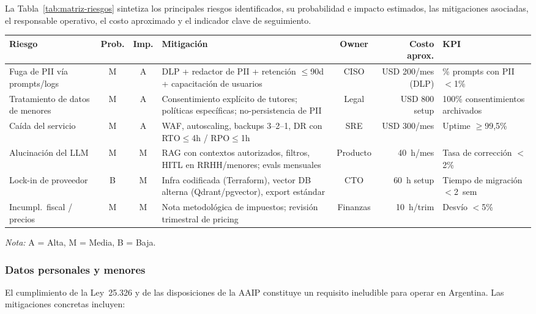 La Tabla~\ref{tab:matriz-riesgos} sintetiza los principales riesgos identificados, su probabilidad e impacto estimados, las mitigaciones asociadas, el responsable operativo, el costo aproximado y el indicador clave de seguimiento.

\begin{center}
\label{tab:matriz-riesgos}
\footnotesize
\begin{adjustbox}{width=\textwidth,center}
\begin{tabular}{p{2.8cm}ccp{4.2cm}crp{2.8cm}}
\hline
\textbf{Riesgo} & \textbf{Prob.} & \textbf{Imp.} & \textbf{Mitigación} & \textbf{Owner} & \textbf{Costo aprox.} & \textbf{KPI} \\
\hline
Fuga de PII vía prompts/logs & M & A & DLP + redactor de PII + retención $\leq$90d + capacitación de usuarios & CISO & USD 200/mes (DLP) & \% prompts con PII $<$1\% \\
\hline
Tratamiento de datos de menores & M & A & Consentimiento explícito de tutores; políticas específicas; no-persistencia de PII & Legal & USD 800 setup & 100\% consentimientos archivados \\
\hline
Caída del servicio & M & A & WAF, autoscaling, backups 3--2--1, DR con RTO$\leq$4h / RPO$\leq$1h & SRE & USD 300/mes & Uptime $\geq$99,5\% \\
\hline
Alucinación del LLM & M & M & RAG con contextos autorizados, filtros, HITL en RRHH/menores; evals mensuales & Producto & 40~h/mes & Tasa de corrección $<$2\% \\
\hline
Lock-in de proveedor & B & M & Infra codificada (Terraform), vector DB alterna (Qdrant/pgvector), export estándar & CTO & 60~h setup & Tiempo de migración $<$2~sem \\
\hline
Incumpl.\ fiscal / precios & M & M & Nota metodológica de impuestos; revisión trimestral de pricing & Finanzas & 10~h/trim & Desvío $<$5\% \\
\hline
\end{tabular}
\end{adjustbox}
\end{center}

\noindent \textit{Nota:} A = Alta, M = Media, B = Baja.

\subsubsection{Datos personales y menores}

El cumplimiento de la Ley~25.326 y de las disposiciones de la AAIP constituye un requisito ineludible para operar en Argentina. Las mitigaciones concretas incluyen:

